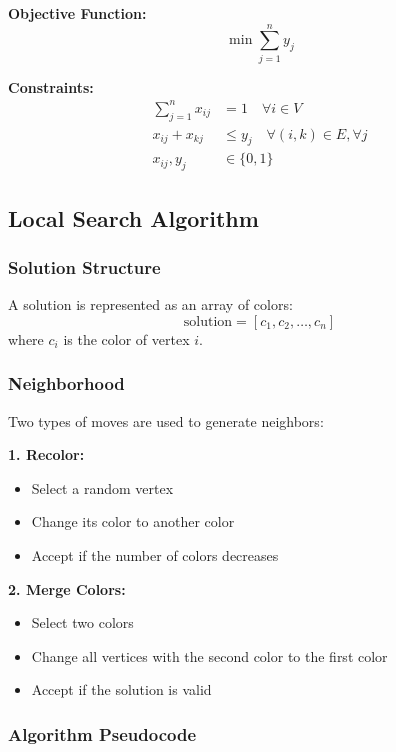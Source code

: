 \documentclass[12pt,a4paper]{article}
\begin{document}
\textbf{Objective Function:}
\begin{equation}
\min \sum_{j=1}^{n} y_j
\end{equation}

\textbf{Constraints:}
\begin{align}
\sum_{j=1}^{n} x_{ij} &= 1 \quad \forall i \in V \\
x_{ij} + x_{kj} &\leq y_j \quad \forall (i,k) \in E, \forall j \\
x_{ij}, y_j &\in \{0,1\}
\end{align}

\subsection{Local Search Algorithm}

\subsubsection{Solution Structure}

A solution is represented as an array of colors:
\[
\text{solution} = [c_1, c_2, \ldots, c_n]
\]
where $c_i$ is the color of vertex $i$.

\subsubsection{Neighborhood}

Two types of moves are used to generate neighbors:

\textbf{1. Recolor:}
\begin{itemize}
    \item Select a random vertex
    \item Change its color to another color
    \item Accept if the number of colors decreases
\end{itemize}

\textbf{2. Merge Colors:}
\begin{itemize}
    \item Select two colors
    \item Change all vertices with the second color to the first color
    \item Accept if the solution is valid
\end{itemize}

\subsubsection{Algorithm Pseudocode}
\end{document}

